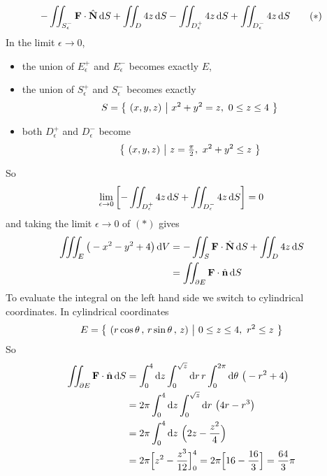 \begin{solution}
\begin{align*}
             -\iint_{S_\epsilon^-}\mathbf{F}\cdot\hat{\mathbf{N}}\,\mathrm{d}S
      + \iint_{D}4z\,\mathrm{d}S
           - \iint_{D_\epsilon^+} 4z\,\mathrm{d}S
           + \iint_{D_\epsilon^-} 4z\,\mathrm{d}S
\tag{$*$}\end{align*}
In the limit $\epsilon\rightarrow 0$,
\begin{itemize}\itemsep1pt \parskip0pt  %
\item
the union of $E_\epsilon^+$ and $E_\epsilon^-$ becomes exactly $E$,
\item
the union of $S_\epsilon^+$ and $S_\epsilon^-$ becomes exactly 
\begin{equation*}
S=\big\{ \ (x,y,z)\ \big|\ x^2+y^2 = z,\ 0\le z\le 4\ \big\}
\end{equation*}
\item
both $D_\epsilon^+$ and $D_\epsilon^-$ become
\begin{equation*}
   \Set{(x,y,z)}{z=\tfrac{\pi}{2},\ x^2+y^2\le z}
\end{equation*} 
\end{itemize}
So
\begin{equation*}
   \lim_{\epsilon\rightarrow  0}\left[- \iint_{D_\epsilon^+} 4z\,\mathrm{d}S
           + \iint_{D_\epsilon^-} 4z\,\mathrm{d}S\right] =0
\end{equation*}
and taking the limit $\epsilon\rightarrow 0$ of $(*)$ gives 
\begin{align*}
\iiint_{E} \big(-x^2-y^2+4\big)\,\mathrm{d}V 
&= -\iint_S\mathbf{F}\cdot\hat{\mathbf{N}}\,\mathrm{d}S + \iint_{D}4z\,\mathrm{d}S \\
&= \iint_{\partial E}\mathbf{F}\cdot\hat{\mathbf{n}}\,\mathrm{d}S
\end{align*}
To evaluate the integral on the left hand side we switch to cylindrical coordinates.
In cylindrical coordinates
\begin{equation*}
E=\big\{ \ (r\cos\theta\,,\,r\sin\theta\,,\,z)\ \big|\ 0\le z\le 4,\ r^2\le z\ \big\}
\end{equation*}
So
\begin{align*}
\dblInt_{\partial E}\vF\cdot\hn\,\dee{S}
&=\int_0^4\dee{z}\int_0^{\sqrt{z}}\dee{r}\,r\int_0^{2\pi}\dee{\theta}\ 
         \big(-r^2+4\big) \\
&=2\pi \int_0^4\dee{z}\int_0^{\sqrt{z}}\dee{r}\ \big(4r-r^3\big) \\
&=2\pi \int_0^4\dee{z}\ \Big(2z-\frac{z^2}{4}\Big) \\
&= 2\pi\Big[z^2-\frac{z^3}{12}\Big]_0^4
=2\pi\Big[16-\frac{16}{3}\Big]
=\frac{64}{3}\pi
\end{align*}


\end{solution}
